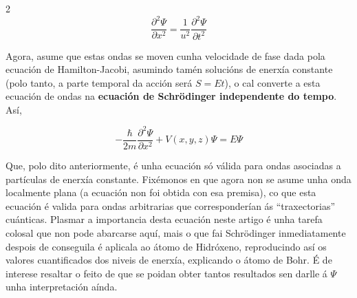 \begin{refsection}
\begin{multicols}{2}
\begin{equation}
        \frac{\partial^2 \Psi}{\partial x^2} =
        \frac{1}{u^2}\frac{\partial^2 \Psi}{\partial t^2}
\end{equation}

Agora, asume que estas ondas se moven cunha velocidade de fase dada pola
ecuación de Hamilton-Jacobi, asumindo tamén solucións de
enerxía constante (polo tanto, a parte temporal da acción será $S=Et$), o cal
converte a esta ecuación de ondas na \textbf{ecuación de Schrödinger
independente do tempo}. Así,

\begin{equation}
    \boxed{
        -\frac{\hbar}{2m}\frac{\partial^2\Psi}{\partial x^2} +
        V(x,y,z)\Psi = E\Psi
    }
\end{equation}

Que, polo dito anteriormente, é unha ecuación só válida para ondas asociadas a
partículas de enerxía constante. Fixémonos en que agora non se asume unha onda localmente
plana (a ecuación non foi obtida con esa premisa), co que esta ecuación é
valida para ondas arbitrarias que corresponderían ás ``traxectorias''
cuánticas. Plasmar a importancia desta ecuación neste artigo é unha tarefa
colosal que non pode abarcarse aquí, mais o que fai Schrödinger inmediatamente
despois de conseguila é aplicala ao átomo de Hidróxeno, reproducindo así os
valores cuantificados dos niveis de enerxía, explicando o átomo de Bohr. É de
interese resaltar o feito de que se poidan obter tantos resultados sen darlle á
$\Psi$ unha interpretación aínda.


\nocite{schrodinger.e_1926}
\nocite{schrodinger.e_1926_2}
\nocite{hamilton_optico_mechanical}
\nocite{hamilton_jacobi_equation}

\printbibliography

\end{multicols}
\end{refsection}
